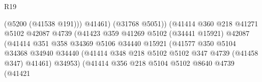 \begin{lexlean}{R19}
\begin{coremodule}
{{{{{{{{{{{                                                (@5200 (@41538 @191)))
                                              @41461)
                                            (@31768 @5051))
                                          (@41414
                                            @360
                                            @218
                                            @41271
                                            @5102
                                            @42087
                                            @4739
                                            (@41423
                                              @359
                                              @41269
                                              @5102
                                              (@34441 @15921)
                                              @42087
                                              (@41414
                                                @351
                                                @358
                                                @34369
                                                @5106
                                                @34440
                                                @15921
                                                (@41577
                                                  @350
                                                  @5104
                                                  @34368
                                                  @34940
                                                  @34440
                                                  (@41414
                                                    @348
                                                    @218
                                                    @5102
                                                    @5102
                                                    @347
                                                    @4739
                                                    (@41458 @347)
                                                    @41461)
                                                  @34953)
                                                (@41414
                                                  @356
                                                  @218
                                                  @5104
                                                  @5102
                                                  @8640
                                                  @4739
                                                  (@41421
}}}}}}}}}}}
\end{coremodule}
\end{lexlean}
